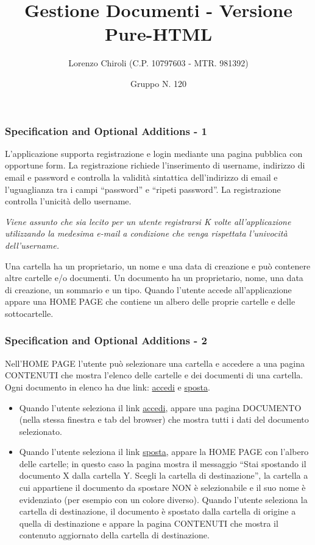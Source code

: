 \documentclass[aspectratio=169]{beamer}
\title{Gestione Documenti - Versione Pure-HTML}
\author{Lorenzo Chiroli (C.P. 10797603 - MTR. 981392)}
\date{Gruppo N. 120}
\begin{document}
\frame{\titlepage}

\begin{frame}
    \frametitle{Specification and Optional Additions - 1}
    L’applicazione supporta registrazione e login mediante una pagina pubblica con opportune form. La registrazione
    richiede l’inserimento di username, indirizzo di email e password e controlla la validità sintattica dell’indirizzo
    di email e l’uguaglianza tra i campi “password” e “ripeti password”. La registrazione controlla l’unicità dello
    username. \newline

    \textit{Viene assunto che sia lecito per un utente registrarsi K volte all'applicazione utilizzando la medesima
        e-mail a condizione che venga rispettata l'univocità dell'username.} \newline

    Una cartella ha un proprietario, un nome e una data di creazione e può contenere altre cartelle e/o documenti. Un
    documento ha un proprietario, nome, una data di creazione, un sommario e un tipo. Quando l’utente accede
    all’applicazione appare una HOME PAGE che contiene un albero delle proprie cartelle e delle sottocartelle.
\end{frame}

\begin{frame}
    \frametitle{Specification and Optional Additions - 2}
    Nell’HOME PAGE l’utente può selezionare una cartella e accedere a una pagina CONTENUTI che mostra l’elenco delle
    cartelle e dei documenti di una cartella. Ogni documento in elenco ha due link: \underline{accedi} e
    \underline{sposta}.

    \begin{itemize}
        \item Quando l’utente seleziona il link \underline{accedi}, appare una pagina DOCUMENTO (nella stessa finestra
              e tab del browser) che mostra tutti i dati del documento selezionato.
        \item Quando l’utente seleziona il link \underline{sposta}, appare la HOME PAGE con l’albero delle cartelle; in
              questo caso la pagina mostra il messaggio “Stai spostando il documento X dalla cartella Y. Scegli la
              cartella di destinazione”, la cartella a cui appartiene il documento da spostare NON è selezionabile e il
              suo nome è evidenziato (per esempio con un colore diverso). Quando l’utente seleziona la cartella di
              destinazione, il documento è spostato dalla cartella di origine a quella di destinazione e appare la
              pagina CONTENUTI che mostra il contenuto aggiornato della cartella di destinazione.
    \end{itemize}
\end{frame}
\end{document}
